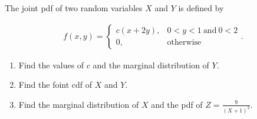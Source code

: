 
\begin{exercise}

The joint pdf of two random variables $X$ and $Y$ is defined by

\begin{align*}
    f(x, y)
    =
    \begin{cases}
        c (x + 2 y), & 0 < y < 1 ~\text{and}~ 0 < 2 \\
        0,           & \text{otherwise}
    \end{cases}.
\end{align*}

\begin{enumerate}[label = (\alph*)]
    \item Find the values of $c$ and the marginal distribution of $Y$.
    \item Find the foint cdf of $X$ and $Y$.
    \item Find the marginal distribution of $X$ and the pdf of $Z = \frac{9}{(X + 1)^2}$.
\end{enumerate}

\end{exercise}



